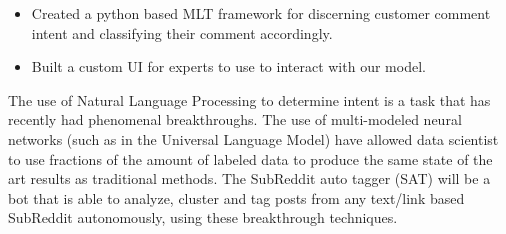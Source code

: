 \documentclass[10pt,a4paper]{altacv}
\begin{document}
\divider

\begin{itemize}
    \item Created a python based MLT framework for discerning customer comment intent and classifying their comment accordingly. 
    \item Built a custom UI for experts to use to interact with our model.
\end{itemize}

\divider
{}
The use of Natural Language Processing to determine intent is a task that has recently had phenomenal breakthroughs. The use of multi-modeled neural networks (such as in the Universal Language Model) have allowed data scientist to use fractions of the amount of labeled data to produce the same state of the art results as traditional methods. The SubReddit auto tagger (SAT) will be a bot that is able to analyze, cluster and tag posts from any text/link based SubReddit autonomously, using these breakthrough techniques. 

\medskip



\clearpage
{}

\nocite{*}

\printbibliography[heading=pubtype,title={\printinfo{\faBook}{Books}},type=book]

\divider

\printbibliography[heading=pubtype,title={\printinfo{\faFileTextO}{Journal Articles}},type=article]

\divider

\printbibliography[heading=pubtype,title={\printinfo{\faGroup}{Conference Proceedings}},type=inproceedings]

\end{document}
